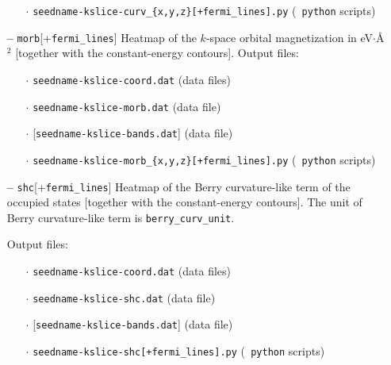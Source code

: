 \begin{itemize}
\begin{itemize}
  \item[$\cdot$] {\tt seedname-kslice-curv\_\{x,y,z\}[+fermi\_lines].py} ({\tt
      python} scripts) 
    
  \end{itemize}

\item[{\bf --}] \verb#morb#[+\verb#fermi_lines#] Heatmap of the
  $k$-space orbital magnetization in eV$\cdot$\AA$^2$ [together with
  the constant-energy contours]. Output files:

  \begin{itemize}

  \item[$\cdot$] {\tt seedname-kslice-coord.dat} (data files)
    
  \item[$\cdot$] {\tt seedname-kslice-morb.dat} (data file)

  \item[$\cdot$] [{\tt seedname-kslice-bands.dat}] (data file)
    
  \item[$\cdot$] {\tt seedname-kslice-morb\_\{x,y,z\}[+fermi\_lines].py} ({\tt
      python} scripts)
    
  \end{itemize}

\item[{\bf --}] \verb#shc#[+\verb#fermi_lines#] Heatmap of the Berry
curvature-like term of the occupied states [together with the constant-energy
contours]. The unit of Berry curvature-like term is {\tt berry\_curv\_unit}.

Output files:

	\begin{itemize}
	
	\item[$\cdot$] {\tt seedname-kslice-coord.dat} (data files)
	
	\item[$\cdot$] {\tt seedname-kslice-shc.dat} (data file)
	
	\item[$\cdot$] [{\tt seedname-kslice-bands.dat}] (data file)
	
	\item[$\cdot$] {\tt seedname-kslice-shc[+fermi\_lines].py} ({\tt
		python} scripts) 
	
	\end{itemize}

\end{itemize}

